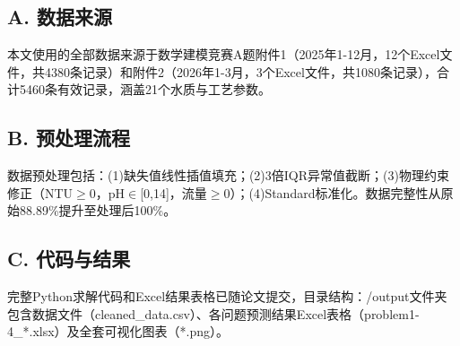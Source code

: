 \documentclass[12pt,a4paper]{ctexart}
\begin{document}
\subsection*{A. 数据来源}
本文使用的全部数据来源于数学建模竞赛A题附件1（2025年1-12月，12个Excel文件，共4380条记录）和附件2（2026年1-3月，3个Excel文件，共1080条记录），合计5460条有效记录，涵盖21个水质与工艺参数。

\subsection*{B. 预处理流程}
数据预处理包括：(1)缺失值线性插值填充；(2)3倍IQR异常值截断；(3)物理约束修正（NTU$\geq$0，pH$\in$[0,14]，流量$\geq$0）；(4)Standard标准化。数据完整性从原始88.89\%提升至处理后100\%。

\subsection*{C. 代码与结果}
完整Python求解代码和Excel结果表格已随论文提交，目录结构：/output文件夹包含数据文件（cleaned\_data.csv）、各问题预测结果Excel表格（problem1-4\_*.xlsx）及全套可视化图表（*.png）。
\end{document}
